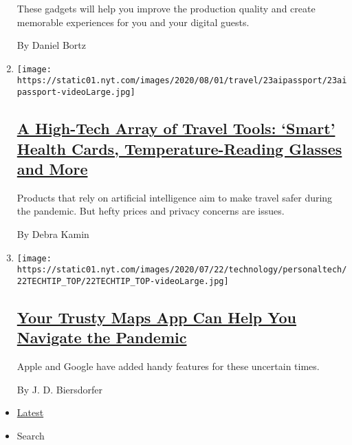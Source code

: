 \begin{enumerate}
  These gadgets will help you improve the production quality and create
  memorable experiences for you and your digital guests.

  By Daniel Bortz
\item
  \texttt{[image: https://static01.nyt.com/images/2020/08/01/travel/23aipassport/23aipassport-videoLarge.jpg]}

  \hypertarget{a-high-tech-array-of-travel-tools-smart-health-cards-temperature-reading-glasses-and-more}{%
  \subsection{\texorpdfstring{\href{/2020/07/23/travel/artificial-intelligence-coronavirus-passport.html}{A
  High-Tech Array of Travel Tools: `Smart' Health Cards,
  Temperature-Reading Glasses and
  More}}{A High-Tech Array of Travel Tools: `Smart' Health Cards, Temperature-Reading Glasses and More}}\label{a-high-tech-array-of-travel-tools-smart-health-cards-temperature-reading-glasses-and-more}}

  Products that rely on artificial intelligence aim to make travel safer
  during the pandemic. But hefty prices and privacy concerns are issues.

  By Debra Kamin
\item
  \texttt{[image: https://static01.nyt.com/images/2020/07/22/technology/personaltech/22TECHTIP\_TOP/22TECHTIP\_TOP-videoLarge.jpg]}

  \hypertarget{your-trusty-maps-app-can-help-you-navigate-the-pandemic}{%
  \subsection{\texorpdfstring{\href{/2020/07/22/technology/personaltech/maps-apps-coronavirus-pandemic.html}{Your
  Trusty Maps App Can Help You Navigate the
  Pandemic}}{Your Trusty Maps App Can Help You Navigate the Pandemic}}\label{your-trusty-maps-app-can-help-you-navigate-the-pandemic}}

  Apple and Google have added handy features for these uncertain times.

  By J. D. Biersdorfer
\end{enumerate}

\begin{itemize}
\tightlist
\item
  \protect\hyperlink{stream-panel}{Latest}
\item
  Search
\end{itemize}

